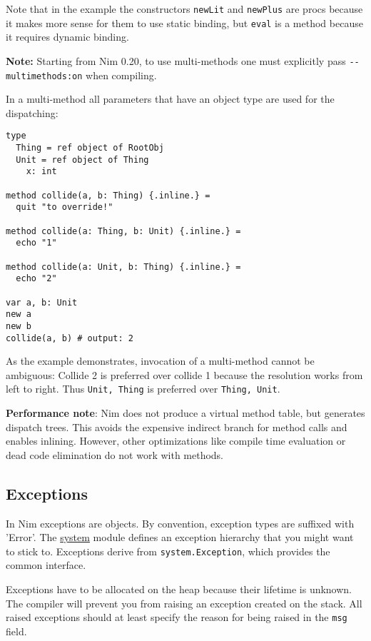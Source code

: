 Note that in the example the constructors \texttt{newLit} and
\texttt{newPlus} are procs because it makes more sense for them to use
static binding, but \texttt{eval} is a method because it requires
dynamic binding.

\textbf{Note:} Starting from Nim 0.20, to use multi-methods one must
explicitly pass \texttt{-\/-multimethods:on} when compiling.

In a multi-method all parameters that have an object type are used for
the dispatching:

\begin{verbatim}
type
  Thing = ref object of RootObj
  Unit = ref object of Thing
    x: int

method collide(a, b: Thing) {.inline.} =
  quit "to override!"

method collide(a: Thing, b: Unit) {.inline.} =
  echo "1"

method collide(a: Unit, b: Thing) {.inline.} =
  echo "2"

var a, b: Unit
new a
new b
collide(a, b) # output: 2
\end{verbatim}

As the example demonstrates, invocation of a multi-method cannot be
ambiguous: Collide 2 is preferred over collide 1 because the resolution
works from left to right. Thus \texttt{Unit,\ Thing} is preferred over
\texttt{Thing,\ Unit}.

\textbf{Performance note}: Nim does not produce a virtual method table,
but generates dispatch trees. This avoids the expensive indirect branch
for method calls and enables inlining. However, other optimizations like
compile time evaluation or dead code elimination do not work with
methods.

\hypertarget{exceptions}{%
\subsection{Exceptions}\label{exceptions}}

In Nim exceptions are objects. By convention, exception types are
suffixed with 'Error'. The \href{system.html}{system} module defines an
exception hierarchy that you might want to stick to. Exceptions derive
from \texttt{system.Exception}, which provides the common interface.

Exceptions have to be allocated on the heap because their lifetime is
unknown. The compiler will prevent you from raising an exception created
on the stack. All raised exceptions should at least specify the reason
for being raised in the \texttt{msg} field.

